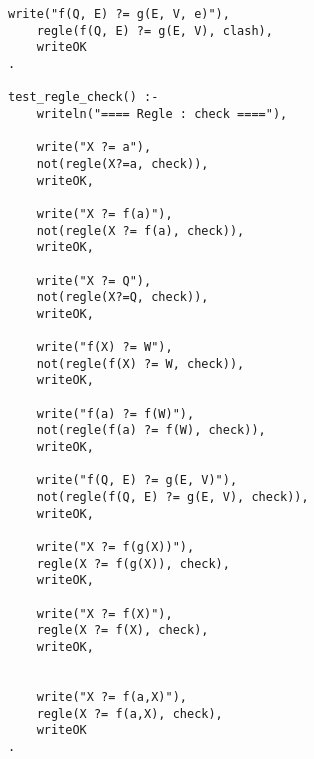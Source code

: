 \documentclass[10pt,a4paper]{report}
\begin{document}
\begin{lstlisting}[caption ={le fichier test.pl}]
	write("f(Q, E) ?= g(E, V, e)"),
	regle(f(Q, E) ?= g(E, V), clash),
	writeOK
.

test_regle_check() :-
	writeln("==== Regle : check ===="),

	write("X ?= a"),
	not(regle(X?=a, check)),
	writeOK,

	write("X ?= f(a)"),
	not(regle(X ?= f(a), check)),
	writeOK,

	write("X ?= Q"),
	not(regle(X?=Q, check)),
	writeOK,

	write("f(X) ?= W"),
	not(regle(f(X) ?= W, check)),
	writeOK,

	write("f(a) ?= f(W)"),
	not(regle(f(a) ?= f(W), check)),
	writeOK,

	write("f(Q, E) ?= g(E, V)"),
	not(regle(f(Q, E) ?= g(E, V), check)),
	writeOK,

	write("X ?= f(g(X))"),
	regle(X ?= f(g(X)), check),
	writeOK,

	write("X ?= f(X)"),
	regle(X ?= f(X), check),
	writeOK,


	write("X ?= f(a,X)"),
	regle(X ?= f(a,X), check),
	writeOK
.


\end{lstlisting}
\end{document}

